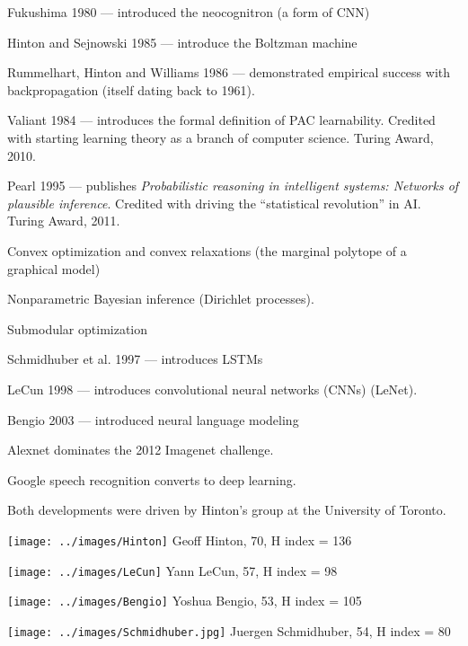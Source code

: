 {Fukushima 1980 --- introduced the neocognitron (a form of CNN)

\vfill
Hinton and Sejnowski 1985 --- introduce the Boltzman machine

\vfill
Rummelhart, Hinton and Williams 1986 --- demonstrated empirical success with backpropagation (itself dating back to 1961).


Valiant 1984 --- introduces the formal definition of PAC learnability.  Credited with starting learning theory as a branch of
computer science.  Turing Award, 2010.

\vfill
Pearl 1995 --- publishes {\it Probabilistic reasoning in intelligent systems: Networks of plausible inference}. Credited with driving the
``statistical revolution'' in AI.  Turing Award, 2011.

\vfill
Convex optimization and convex relaxations (the marginal polytope of a graphical model)

\vfill
Nonparametric Bayesian inference (Dirichlet processes).

\vfill
Submodular optimization


Schmidhuber et al. 1997 --- introduces LSTMs

\vfill
LeCun 1998 --- introduces convolutional neural networks (CNNs) (LeNet).

\vfill
Bengio 2003 --- introduced neural language modeling


Alexnet dominates the 2012 Imagenet challenge.

\vfill
Google speech recognition converts to deep learning.

\vfill
Both developments were driven by Hinton's group at the University of Toronto.



\texttt{[image: ../images/Hinton]} Geoff Hinton, 70, H index = 136

\vfill
\texttt{[image: ../images/LeCun]} Yann LeCun, 57, H index = 98

\vfill
\texttt{[image: ../images/Bengio]} Yoshua Bengio, 53, H index = 105

\vfill
\texttt{[image: ../images/Schmidhuber.jpg]} Juergen Schmidhuber, 54, H index = 80


}

